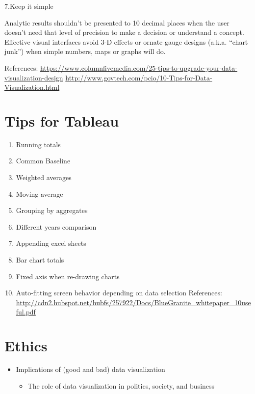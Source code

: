 \documentclass[]{book}
\providecommand{\tightlist}{%
  \setlength{\itemsep}{0pt}\setlength{\parskip}{0pt}}
\theoremstyle{definition}
\theoremstyle{definition}
\theoremstyle{definition}
\theoremstyle{remark}
\begin{document}
7.Keep it simple

Analytic results shouldn't be presented to 10 decimal places when the
user doesn't need that level of precision to make a decision or
understand a concept. Effective visual interfaces avoid 3-D effects or
ornate gauge designs (a.k.a. ``chart junk'') when simple numbers, maps
or graphs will do.

References:
\url{https://www.columnfivemedia.com/25-tips-to-upgrade-your-data-visualization-design}
\url{http://www.govtech.com/pcio/10-Tips-for-Data-Visualization.html}

\chapter{Tips for Tableau}\label{tips-for-tableau-1}

\begin{enumerate}
\def\labelenumi{\arabic{enumi}.}
\tightlist
\item
  Running totals
\item
  Common Baseline
\item
  Weighted averages
\item
  Moving average
\item
  Grouping by aggregates
\item
  Different years comparison
\item
  Appending excel sheets
\item
  Bar chart totals
\item
  Fixed axis when re-drawing charts
\item
  Auto-fitting screen behavior depending on data selection References:
  \url{http://cdn2.hubspot.net/hubfs/257922/Docs/BlueGranite_whitepaper_10useful.pdf}
\end{enumerate}

\chapter{Ethics}\label{ethics}

\begin{itemize}
\tightlist
\item
  Implications of (good and bad) data visualization

  \begin{itemize}
  \tightlist
  \item
    The role of data visualization in politics, society, and business
  \end{itemize}
\end{itemize}
\end{document}
